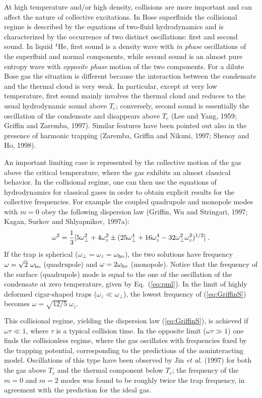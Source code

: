 At high temperature and/or high density, collisions are more important 
and can affect the nature of collective excitations. In Bose superfluids 
the collisional regime is described by the equations of two-fluid 
hydrodynamics and is characterized by the occurrence of two distinct 
oscillations: first and second sound. In liquid $^4$He, first sound is 
a density wave with {\it in phase} oscillations of the superfluid and 
normal components, while second sound is an almost pure entropy wave 
with {\it opposite phase} motion of the two components. For a dilute Bose 
gas the situation is different because the interaction between the condensate 
and the thermal cloud is very weak. In particular, except at very low 
temperature, first sound mainly involves the thermal cloud and reduces 
to the usual hydrodynamic sound above $T_c$; conversely, second sound is
essentially the oscillation of the condensate and disappears above $T_c$ 
(Lee and Yang, 1959;   Griffin and Zaremba, 1997).  Similar features 
have been pointed out also in the  presence of harmonic trapping (Zaremba,
Griffin and Nikuni, 1997; Shenoy and Ho, 1998). 
 
An important limiting case is represented by the collective motion of the 
gas above the critical temperature, where the gas exhibits an almost 
classical behavior. In the collisional regime, one can then use the 
equations of hydrodynamics for classical gases in order to obtain 
explicit results for the collective frequencies. For example the 
coupled quadrupole and monopole modes with $m=0$ obey the following 
dispersion law (Griffin, Wu and Stringari, 1997; Kagan, Surkov and 
Shlyapnikov, 1997a):
\begin{equation}
\omega^2 = {1\over 3}[5\omega_{\perp}^2 + 4 \omega_z^2
\pm (25 \omega_{\perp}^4 + 16 \omega_z^4 -32
\omega_{\perp}^2\omega_z^2)^{1/2}]  \; .
\label{eq:GriffinS}
\end{equation}
If the trap is spherical ($\omega_{\perp}=\omega_z=\omega_{\rm ho}$),
the two solutions have frequency $\omega =\sqrt{2} \ \omega_{\rm ho}$ 
(quadrupole) and $\omega=2\omega_{\rm ho}$ (monopole). Notice that 
the frequency of the surface (quadrupole) mode is equal to the one of 
the oscillation of the condensate at zero temperature, given by 
Eq.~(\ref{eq:pml}). In the limit of highly deformed cigar-shaped traps 
($\omega_z\ll\omega_{\perp}$), the lowest frequency of (\ref{eq:GriffinS}) 
becomes $\omega= \sqrt{12/5}\ \omega_z$. 

This collisional regime, yielding the dispersion law (\ref{eq:GriffinS}),
is achieved if $\omega \tau \ll 1$, where $\tau$ is a typical collision 
time. In the opposite limit ($\omega \tau \gg 1$) one finds the 
collisionless regime, where the gas oscillates with frequencies fixed by 
the trapping potential, corresponding to the predictions of the 
noninteracting model. Oscillations of 
this type have been observed by Jin {\it et al.} (1997) for both the 
gas above $T_c$ and the thermal component below $T_c$; the frequency 
of the $m=0$ and $m=2$ modes was found to be roughly twice the trap 
frequency, in agreement with the prediction for the ideal gas. 


